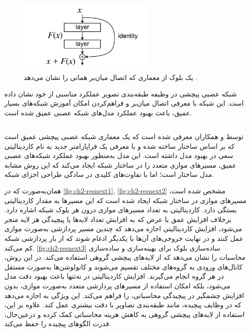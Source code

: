 \begin{figure}[h]
    \centering
    \includegraphics[width=0.6\textwidth]{Images/Chapter2/ResBlock.png}
    \caption{یک بلوک از معماری 
    که اتصال  میان‌بر همانی را نشان می‌دهد
    \cite{wikipediaResidualNeural}.}
    \label{fig:ch-2resnet_block}
\end{figure}
شبکه عصبی پیچشی 
 در وظیفه طبقه‌بندی تصویر عملکرد مناسبی از خود نشان داده است. این شبکه با معرفی اتصال  میان‌بر و  فراهم‌کردن امکان آموزش شبکه‌های بسیار عمیق، باعث بهبود عملکرد مدل‌های شبکه عصبی عمیق شده‌ است.


\subsection{}

توسط 
\cite{xie2017aggregated}
و همکاران معرفی شده است که 
یک معماری شبکه عصبی پیچشی عمیق است که بر اساس ساختار 
ساخته شده و با معرفی یک فراپارامتر
 جدید به نام کاردینالیتی
  سعی در بهبود مدل 
  داشته است.
 این مدل به‌منظور بهبود عملکرد شبکه‌های عصبی عمیق،  مسیرهای موازی متعدد را در ساختار شبکه ایجاد می‌کند که این روش مشابه مدل ساختار
است؛ اما با تفاوت‌های کلیدی در سادگی طراحی اجزای شبکه.

همان‌به‌صورت که در 
\autoref{fig:ch2-resnext1}, \autoref{fig:ch2-resnext2}
مشخص شده است، مسیرهای موازی در ساختار شبکه ایجاد شده است که این مسیرها به مقدار کاردینالیتی بستگی دارد.
کاردینالیتی به تعداد مسیرهای موازی درون هر بلوک شبکه اشاره دارد. برخلاف افزایش عمق یا عرض که به افزایش تعداد لایه‌ها یا پیچیدگی هر لایه منجر می‌شود، افزایش کاردینالیتی اجازه می‌دهد که چندین مسیر پردازشی به‌صورت موازی عمل کنند و در نهایت خروجی‌های آن‌ها با یکدیگر ادغام شوند که از بار پردازشی شبکه کم می‌کند.
\autoref{fig:ch2-resnext3}
ساده‌سازی بلوک 
برای بهینه‌سازی و ساده‌سازی محاسبات را نشان می‌دهد که از لایه‌های پیچشی گروهی استفاده می‌کند. در این روش، کانال‌های 
ورودی به گروه‌های مختلف تقسیم می‌شوند و کانولوشن‌ها به‌صورت مستقل در هر گروه انجام می‌گیرند.
افزایش کاردینالیتی در  نه‌تنها باعث بهبود دقت مدل می‌شود، بلکه امکان استفاده از مسیرهای پردازشی متعدد به‌صورت موازی، بدون افزایش چشمگیر در پیچیدگی محاسباتی، را فراهم می‌کند. این ویژگی به  اجازه می‌دهد که در وظایف پیچیده، مانند طبقه‌بندی تصاویر با دقت بیشتری عمل کند. علاوه بر این، استفاده از لایه‌های پیچشی گروهی به کاهش هزینه محاسباتی کمک کرده و درعین‌حال، قدرت الگوهای پیچیده را حفظ می‌کند.

